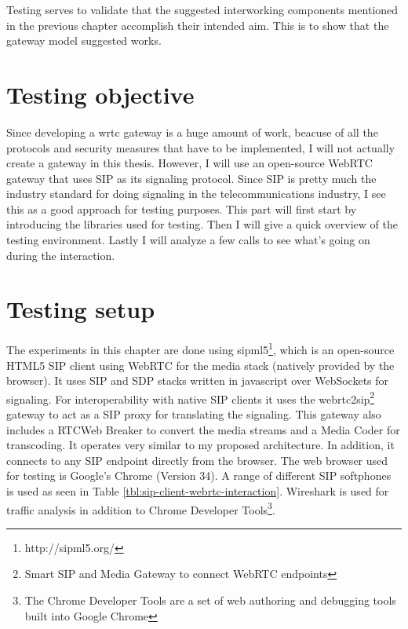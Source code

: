 



Testing serves to validate that the suggested interworking components mentioned in the previous chapter accomplish their intended aim. This is to show that the gateway model suggested works.

\section{Testing objective}
Since developing a \gls{wrtc} gateway is a huge amount of work, beacuse of all the protocols and security measures that have to be implemented, I will not actually create a gateway in this thesis. However, I will use an open-source WebRTC gateway that uses SIP as its signaling protocol. Since SIP is pretty much the industry standard for doing signaling in the telecommunications industry, I see this as a good approach for testing purposes. This part will first start by introducing the libraries used for testing. Then I will give a quick overview of the testing environment. Lastly I will analyze a few calls to see what's going on during the interaction.

\section{Testing setup}
The experiments in this chapter are done using sipml5\footnote{http://sipml5.org/}, which is an open-source HTML5 SIP client using WebRTC for the media stack (natively provided by the browser). It uses SIP and SDP stacks written in javascript over WebSockets for signaling. For interoperability with native SIP clients it uses the webrtc2sip\footnote{Smart SIP and Media Gateway to connect WebRTC endpoints} gateway to act as a SIP proxy for translating the signaling. This gateway also includes a RTCWeb Breaker to convert the media streams and a Media Coder for transcoding. It operates very similar to my proposed architecture. In addition, it connects to any SIP endpoint directly from the browser. The web browser used for testing is Google's Chrome (Version 34). A range of different SIP softphones is used as seen in Table \ref{tbl:sip-client-webrtc-interaction}. Wireshark is used for traffic analysis in addition to Chrome Developer Tools\footnote{The Chrome Developer Tools are a set of web authoring and debugging tools built into Google Chrome}.

